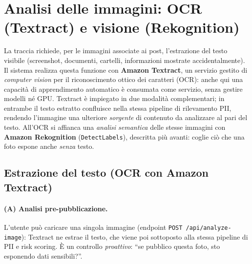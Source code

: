 \documentclass[11pt,a4paper]{article}
\begin{document}
\section{Analisi delle immagini: OCR (Textract) e visione (Rekognition)}
\label{sec:ocr}
La traccia richiede, per le immagini associate ai post, l'estrazione del testo
visibile (screenshot, documenti, cartelli, informazioni mostrate accidentalmente). Il
sistema realizza questa funzione con \textbf{Amazon Textract}, un servizio gestito di
\emph{computer vision} per il riconoscimento ottico dei caratteri (OCR): anche qui una
capacità di apprendimento automatico è consumata come servizio, senza gestire modelli né
GPU. Textract è impiegato in due modalità complementari; in entrambe il testo estratto
confluisce nella stessa pipeline di rilevamento PII, rendendo l'immagine una ulteriore
\emph{sorgente} di contenuto da analizzare al pari del testo. All'OCR si affianca una
\emph{analisi semantica} delle stesse immagini con \textbf{Amazon Rekognition}
(\texttt{DetectLabels}), descritta più avanti: coglie ciò che una foto espone anche
\emph{senza} testo.

\subsection{Estrazione del testo (OCR con Amazon Textract)}
\paragraph{(A) Analisi pre-pubblicazione.} L'utente può caricare una singola immagine
(endpoint \texttt{POST /api/analyze-image}): Textract ne estrae il testo, che viene
poi sottoposto alla stessa pipeline di PII e risk scoring. È un controllo
\emph{proattivo}: ``se pubblico questa foto, sto esponendo dati sensibili?''.
\end{document}
